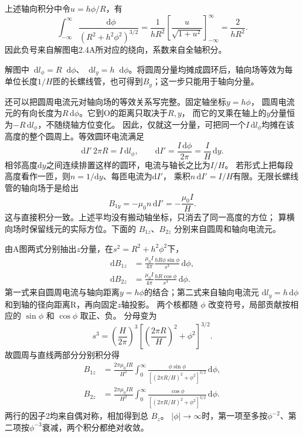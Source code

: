 \documentclass[UTF8,fontset=fandol,a4paper,11pt]{ctexart}
\newcommand{\dd}{\mathop{}\!\mathrm{d}}
\begin{document}
上述轴向积分中令$u=h\phi/R$，有
\[
 \int_{-\infty}^{\infty}\frac{\dd\phi}{(R^2+h^2\phi^2)^{3/2}}
 =\frac1{hR^2}
 \left[\frac{u}{\sqrt{1+u^2}}\right]_{-\infty}^{\infty}
 =\frac2{hR^2}.
\]
因此负号来自解图电2.4A所对应的绕向，系数来自全轴积分。

解图中$\dd l_\phi=R\dd\phi$、$\dd l_y=h\dd\phi$。将圆周分量均摊成圆环后，轴向场等效为每单位长度$1/H$匝的长螺线管，也可得到$B_y$；这一步只能用于轴向分量。

还可以把圆周电流元对轴向场的等效关系写完整。固定轴坐标$y=h\phi$，
圆周电流元的有向长度为$R\,\mathrm d\phi$。它到O的距离只取决于$R,y$，
而它的叉乘在轴上的$y$分量恒为$-R\,\mathrm dl_\phi$，不随绕轴方位变化。
因此，仅就这一分量，可把同一个$I\,\mathrm dl_\phi$均摊在该高度的整个圆周上。等效圆环电流满足
\[
\mathrm dI'\,2\pi R=I\,\mathrm dl_\phi,\qquad
\mathrm dI'=\frac{I\,\mathrm d\phi}{2\pi}
=\frac I H\,\mathrm dy.
\]
相邻高度$\mathrm dy$之间连续排置这样的圆环，电流与轴长之比为$I/H$。
若形式上把每段高度看作一匝，则$n=1/\mathrm dy$、每匝电流为$\mathrm dI'$，
乘积$n\,\mathrm dI'=I/H$有限。无限长螺线管的轴向场于是给出
\[
B_{1y}=-\mu_0 n\,\mathrm dI'=-\frac{\mu_0I}{H}.
\]
这与直接积分一致。上述平均没有搬动轴坐标，只消去了同一高度的方位；
算横向场时保留线元的实际方位。下面的 $B_{1z}$、$B_{2z}$ 分别来自圆周和轴向电流元。

由A图两式分别抽出$z$分量，在$s^2=R^2+h^2\phi^2$下，
\[
\begin{aligned}
\mathrm dB_{1z}
&=\frac{\mu_0I}{4\pi}\frac{hR\phi\sin\phi}{s^3}\,\mathrm d\phi,\\
\mathrm dB_{2z}
&=\frac{\mu_0I}{4\pi}\frac{hR\cos\phi}{s^3}\,\mathrm d\phi.
\end{aligned}
\]
第一式来自圆周电流与轴向距离$y=h\phi$的结合；第二式来自轴向电流元
$\mathrm dl_y=h\,\mathrm d\phi$和到轴的径向距离R，再向固定$z$轴投影。
两个核都随 $\phi$ 改变符号，局部贡献按相应的 $\sin\phi$ 和 $\cos\phi$ 取正、负。
分母变为
\[
s^3=\left(\frac H{2\pi}\right)^3
\left[\left(\frac{2\pi R}{H}\right)^2+\phi^2\right]^{3/2}.
\]
故圆周与直线两部分分别积分得
\[
\begin{aligned}
B_{1z}&=\frac{2\pi\mu_0IR}{H^2}\int_0^\infty
\frac{\phi\sin\phi}{[(2\pi R/H)^2+\phi^2]^{3/2}}\,\mathrm d\phi,\\
B_{2z}&=\frac{2\pi\mu_0IR}{H^2}\int_0^\infty
\frac{\cos\phi}{[(2\pi R/H)^2+\phi^2]^{3/2}}\,\mathrm d\phi.
\end{aligned}
\]
两行的因子2均来自偶对称，相加得到总 $B_z$。
$|\phi|\to\infty$时，第一项至多按$\phi^{-2}$、第二项按$\phi^{-3}$衰减，两个积分都绝对收敛。
\end{document}
